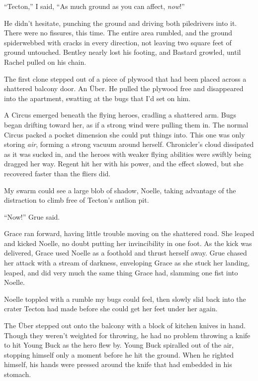 ``Tecton,'' I said, ``As much ground as you can affect, \emph{now}!''



He didn't hesitate, punching the ground and driving both piledrivers into it.  There were no fissures, this time.  The entire area rumbled, and the ground spiderwebbed with cracks in every direction, not leaving two square feet of ground untouched.  Bentley nearly lost his footing, and Bastard growled, until Rachel pulled on his chain.



The first clone stepped out of a piece of plywood that had been placed across a shattered balcony door.  An \"{U}ber.  He pulled the plywood free and disappeared into the apartment, swatting at the bugs that I'd set on him.



A Circus emerged beneath the flying heroes, cradling a shattered arm.  Bugs began drifting toward her, as if a strong wind were pulling them in.  The normal Circus packed a pocket dimension she could put things into.  This one was only storing \emph{air}, forming a strong vacuum around herself.  Chronicler's cloud dissipated as it was sucked in, and the heroes with weaker flying abilities were swiftly being dragged her way.  Regent hit her with his power, and the effect slowed, but she recovered faster than the fliers did.



My swarm could see a large blob of shadow, Noelle, taking advantage of the distraction to climb free of Tecton's antlion pit.



``Now!'' Grue said.



Grace ran forward, having little trouble moving on the shattered road.  She leaped and kicked Noelle, no doubt putting her invincibility in one foot.  As the kick was delivered, Grace used Noelle as a foothold and thrust herself away.  Grue chased her attack with a stream of darkness, enveloping Grace as she stuck her landing, leaped, and did very much the same thing Grace had, slamming one fist into Noelle.



Noelle toppled with a rumble my bugs could feel, then slowly slid back into the crater Tecton had made before she could get her feet under her again.



The \"{U}ber stepped out onto the balcony with a block of kitchen knives in hand.  Though they weren't weighted for throwing, he had no problem throwing a knife to hit Young Buck as the hero flew by.  Young Buck spiralled out of the air, stopping himself only a moment before he hit the ground.  When he righted himself, his hands were pressed around the knife that had embedded in his stomach.



